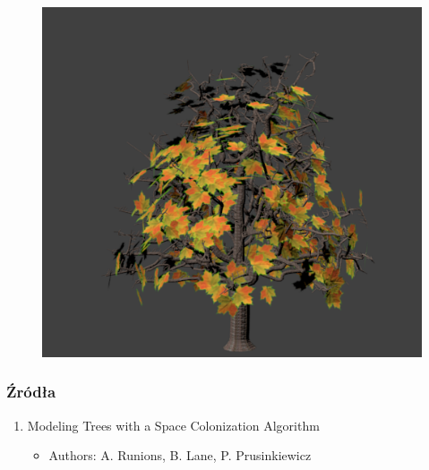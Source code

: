 \documentclass[blue,table]{beamer}
\begin{document}
\begin{frame}
\begin{multicols}{3}
\begin{figure}
\end{figure}
\begin{figure}
\includegraphics[scale=0.25]{img/blender/blender18.png} 
\end{figure}
\end{multicols}
\end{frame}



\begin{frame}\frametitle{Źródła}
\begin{enumerate}
\item{Modeling Trees with a Space Colonization Algorithm}
\begin{itemize}
\item{Authors: A. Runions, B. Lane, P. Prusinkiewicz}
\end{itemize}
\end{enumerate}
\end{frame}
\end{document}
